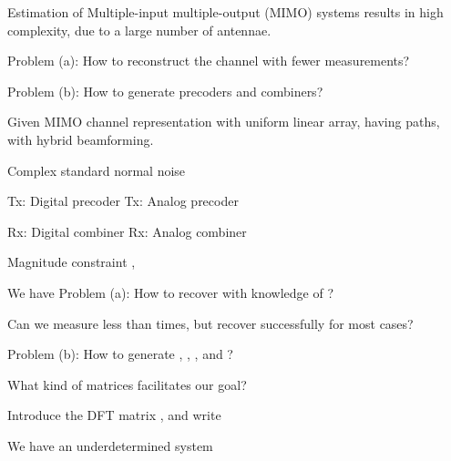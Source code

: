 
\Title {\TitleText}
\blank [big]

\Subtitle {\AuthorText}
\blank [big]

\Subsubtitle {\InstitutionText}

\page [yes]
{
\blank [big]

\I Estimation of Multiple-input multiple-output (MIMO) systems results in high complexity, due to a large number of antennae.

\I Problem (a): How to reconstruct the channel with fewer measurements?

\I Problem (b): How to generate precoders and combiners?
}
{
\I Given MIMO channel representation  with uniform linear array, having  paths, with hybrid beamforming.

\I Complex standard normal noise 

\I Tx: Digital precoder 
\I Tx: Analog precoder 

\I Rx: Digital combiner 
\I Rx: Analog combiner 

\I Magnitude constraint , 
}
{
\I We have 
%
\I Problem (a): How to recover  with knowledge of ?

\I Can we measure less than  times, but recover successfully for most cases?

\I Problem (b): How to generate , , , and ?

\I What kind of matrices facilitates our goal?
}
{
\I Introduce the DFT matrix , and write

\I We have an underdetermined system 
}
